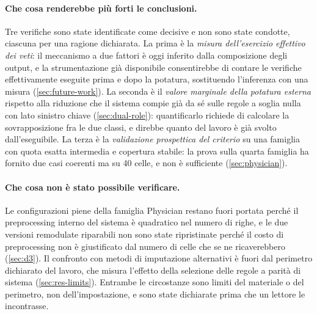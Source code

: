 

\paragraph{Che cosa renderebbe più forti le conclusioni.} Tre verifiche sono state identificate
come decisive e non sono state condotte, ciascuna per una ragione dichiarata. La prima è la
\emph{misura dell'esercizio effettivo dei veti}: il meccanismo a due fattori è oggi inferito dalla
composizione degli output, e la strumentazione già disponibile consentirebbe di contare le
verifiche effettivamente eseguite prima e dopo la potatura, sostituendo l'inferenza con una misura
(\autoref{sec:future-work}). La seconda è il \emph{valore marginale della potatura esterna}
rispetto alla riduzione che il sistema compie già da sé sulle regole a soglia nulla con lato
sinistro chiave (\autoref{sec:dual-role}): quantificarlo richiede di calcolare la sovrapposizione
fra le due classi, e direbbe quanto del lavoro è già svolto dall'eseguibile. La terza è la
\emph{validazione prospettica del criterio} su una famiglia con quota esatta intermedia e
copertura stabile: la prova sulla quarta famiglia ha fornito due casi coerenti ma su \num{40}
celle, e non è sufficiente (\autoref{sec:physician}).

\paragraph{Che cosa non è stato possibile verificare.} Le configurazioni piene della famiglia
Physician restano fuori portata perché il preprocessing interno del sistema è quadratico nel numero
di righe, e le due versioni remodulate riparabili non sono state ripristinate perché il costo di
preprocessing non è giustificato dal numero di celle che se ne ricaverebbero
(\autoref{sec:d3}). Il confronto con metodi di imputazione alternativi è fuori dal perimetro
dichiarato del lavoro, che misura l'effetto della selezione delle regole a parità di sistema
(\autoref{sec:res-limits}). Entrambe le circostanze sono limiti del materiale o del perimetro, non
dell'impostazione, e sono state dichiarate prima che un lettore le incontrasse.
